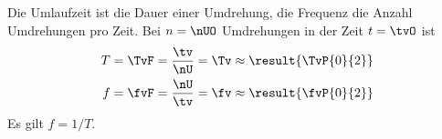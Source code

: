 Die Umlaufzeit ist die Dauer einer Umdrehung, die Frequenz die Anzahl Umdrehungen pro Zeit. Bei $n = \nUO$ Umdrehungen in der Zeit $t = \tvO$ ist
\begin{align}
 T &= \TvF = \frac{\tv}{\nU} = \Tv \approx \result{\TvP{0}{2}} \\
 f &= \fvF = \frac{\nU}{\tv} = \fv \approx \result{\fvP{0}{2}}
\end{align}
Es gilt $f = 1/T$.
